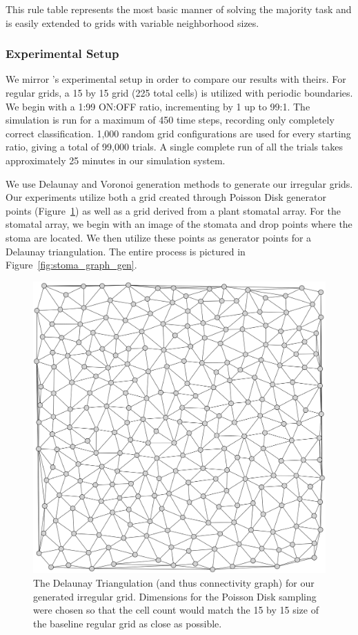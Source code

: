 \documentclass[a4paper,11pt]{article}
\begin{document}
\noindent This rule table represents the most basic manner of solving the majority task and is easily extended to grids with variable neighborhood sizes.

\subsubsection*{Experimental Setup}
We mirror \citeauthor{me07}'s experimental setup in order to compare our results with theirs. For regular grids, a 15 by 15 grid (225 total cells) is utilized with periodic boundaries. We begin with a 1:99 ON:OFF ratio, incrementing by 1 up to 99:1. The simulation is run for a maximum of 450 time steps, recording only completely correct classification. 1,000 random grid configurations are used for every starting ratio, giving a total of 99,000 trials. A single complete run of all the trials takes approximately 25 minutes in our simulation system.

We use Delaunay and Voronoi generation methods to generate our irregular grids. Our experiments utilize both a grid created through Poisson Disk generator points (Figure~\ref{fig:lm_delaunay}) as well as a grid derived from a plant stomatal array. For the stomatal array, we begin with an image of the stomata and drop points where the stoma are located. We then utilize these points as generator points for a Delaunay triangulation. The entire process is pictured in Figure~\ref{fig:stoma_graph_gen}.

\begin{figure}[htp]
\centering
\includegraphics[width=\textwidth]{ch5_figs/lm_delaunay}
\caption[Irregular Delaunay Grid for Majority Task]{
  The Delaunay Triangulation (and thus connectivity graph) for our generated irregular grid. Dimensions for the Poisson Disk sampling were chosen so that the cell count would match the 15 by 15 size of the baseline regular grid as close as possible.
}
\label{fig:lm_delaunay}
\end{figure}
\end{document}
